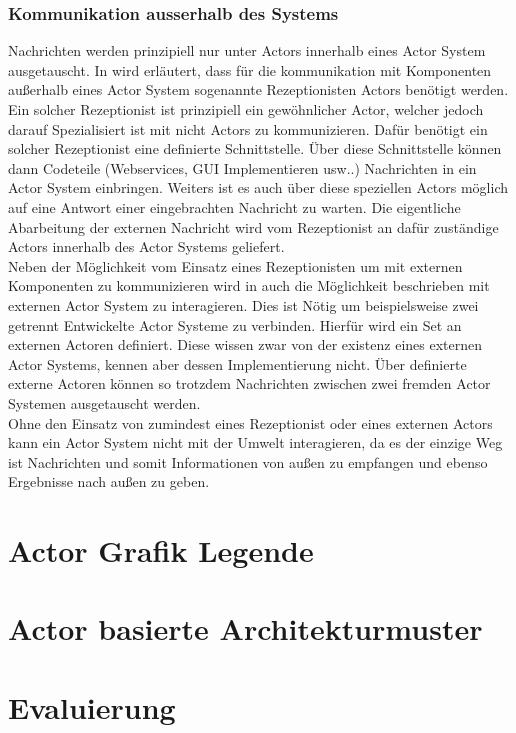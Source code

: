 \subsubsection{Kommunikation ausserhalb des Systems}
Nachrichten werden prinzipiell nur unter Actors innerhalb eines Actor System ausgetauscht. In \cite{Agha1985ActorsSystems} wird erläutert, dass für die kommunikation mit Komponenten außerhalb eines Actor System sogenannte Rezeptionisten Actors benötigt werden.\\
Ein solcher Rezeptionist ist prinzipiell ein gewöhnlicher Actor, welcher jedoch darauf Spezialisiert ist mit nicht Actors zu kommunizieren. Dafür benötigt ein solcher Rezeptionist eine definierte Schnittstelle. Über diese Schnittstelle können dann Codeteile (Webservices, GUI Implementieren usw..) Nachrichten in ein Actor System einbringen. Weiters ist es auch über diese speziellen Actors möglich auf eine Antwort einer eingebrachten Nachricht zu warten. Die eigentliche Abarbeitung der externen Nachricht wird vom Rezeptionist an dafür zuständige Actors innerhalb des Actor Systems geliefert.\citep{Agha1985ActorsSystems}\\
Neben der Möglichkeit vom Einsatz eines Rezeptionisten um mit externen Komponenten zu kommunizieren wird in \cite{Agha1985ActorsSystems} auch die Möglichkeit beschrieben mit externen Actor System zu interagieren. Dies ist Nötig um beispielsweise zwei getrennt Entwickelte Actor Systeme zu verbinden. Hierfür wird ein Set an externen Actoren definiert. Diese wissen zwar von der existenz eines externen Actor Systems, kennen aber dessen Implementierung nicht. Über definierte externe Actoren können so trotzdem Nachrichten zwischen zwei fremden Actor Systemen ausgetauscht werden. \\
Ohne den Einsatz von zumindest eines Rezeptionist oder eines externen Actors kann ein Actor System nicht mit der Umwelt interagieren, da es der einzige Weg ist Nachrichten und somit Informationen von außen zu empfangen und ebenso Ergebnisse nach außen zu geben. 

\section{Actor Grafik Legende}

\section{Actor basierte Architekturmuster}
\label{theory:actorArchitecture}
\section{Evaluierung}
